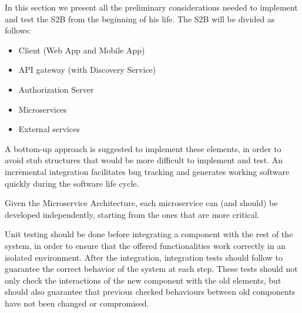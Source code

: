 
In this section we present all the preliminary considerations needed to implement and test the S2B from the beginning of his life.
\newline
\newline
The S2B will be divided as follows:
\begin{itemize}
    \item Client (Web App and Mobile App)
    \item API gateway (with Discovery Service)
    \item Authorization Server
    \item Microservices
    \item External services
\end{itemize}
 
A bottom-up approach is suggested to implement these elements, in order to avoid stub structures that would be more difficult to implement and test. An incremental integration facilitates bug tracking and generates working software quickly during the software life cycle.

Given the Microservice Architecture, each microservice can (and should) be developed independently, starting from the ones that are more critical.
\newline

Unit testing should be done before integrating a component with the rest of the system, in order to ensure that the offered functionalities work correctly in an isolated environment. After the integration, integration tests should follow to guarantee the correct behavior of the system at each step. These tests should not only check the interactions of the new component with the old elements, but should also guarantee that previous checked behaviours between old components have not been changed or compromised.
